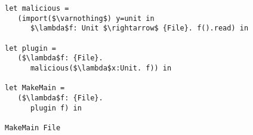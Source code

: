 \documentclass[sigplan,10pt,review]{acmart}\settopmatter{printfolios=true,printccs=false,printacmref=false}
\newcommand{\kwa}[1]{\mathtt{#1}}
\newcommand{\opercalc}{\kwa{OC}}
\newcommand{\epscalc}{\kwa{CC}}
\begin{document}
\begin{lstlisting}
let malicious =
   (import($\varnothing$) y=unit in
      $\lambda$f: Unit $\rightarrow$ {File}. f().read) in

let plugin =
   ($\lambda$f: {File}.
      malicious($\lambda$x:Unit. f)) in

let MakeMain =
   ($\lambda$f: {File}.
      plugin f) in

MakeMain File
\end{lstlisting}

%
%
\end{document}
